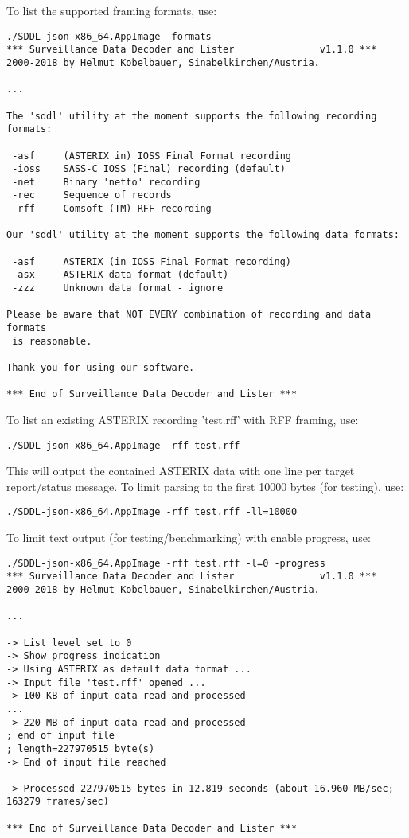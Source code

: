 To list the supported framing formats, use:
\begin{lstlisting}
./SDDL-json-x86_64.AppImage -formats
*** Surveillance Data Decoder and Lister			   v1.1.0 ***
2000-2018 by Helmut Kobelbauer, Sinabelkirchen/Austria.

...

The 'sddl' utility at the moment supports the following recording formats:

 -asf     (ASTERIX in) IOSS Final Format recording
 -ioss    SASS-C IOSS (Final) recording (default)
 -net     Binary 'netto' recording
 -rec     Sequence of records
 -rff     Comsoft (TM) RFF recording

Our 'sddl' utility at the moment supports the following data formats:

 -asf     ASTERIX (in IOSS Final Format recording)
 -asx     ASTERIX data format (default)
 -zzz     Unknown data format - ignore

Please be aware that NOT EVERY combination of recording and data formats
 is reasonable.

Thank you for using our software.

*** End of Surveillance Data Decoder and Lister ***
\end{lstlisting}

To list an existing ASTERIX recording 'test.rff' with RFF framing, use:
\begin{lstlisting}
./SDDL-json-x86_64.AppImage -rff test.rff
\end{lstlisting}

This will output the contained ASTERIX data with one line per target report/status message. To limit parsing to the first 10000 bytes (for testing), use:
\begin{lstlisting}
./SDDL-json-x86_64.AppImage -rff test.rff -ll=10000
\end{lstlisting}

To limit text output (for testing/benchmarking) with enable progress, use:
\begin{lstlisting}
./SDDL-json-x86_64.AppImage -rff test.rff -l=0 -progress
*** Surveillance Data Decoder and Lister			   v1.1.0 ***
2000-2018 by Helmut Kobelbauer, Sinabelkirchen/Austria.

...

-> List level set to 0
-> Show progress indication
-> Using ASTERIX as default data format ...
-> Input file 'test.rff' opened ...
-> 100 KB of input data read and processed
...
-> 220 MB of input data read and processed
; end of input file
; length=227970515 byte(s)
-> End of input file reached

-> Processed 227970515 bytes in 12.819 seconds (about 16.960 MB/sec;
163279 frames/sec)

*** End of Surveillance Data Decoder and Lister ***
\end{lstlisting}

